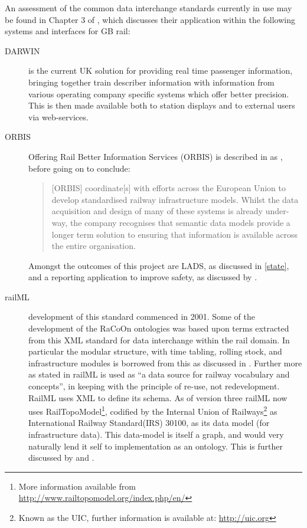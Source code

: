 An assessment of the common data interchange standards currently in use may be found in Chapter 3 of \citet{Tutcher2015}, which discusses their application within the following systems and interfaces for GB rail:
\begin{description}
    \item[DARWIN] is the current UK solution for providing real time passenger information, bringing together train describer information with information from various operating company specific systems which offer better precision. This is then made available both to station displays and to external users via web-services.
    \item[ORBIS] Offering Rail Better Information Services (ORBIS) is described in \citet{Tutcher2015}  as , before going on to conclude: 
    \begin{quote}
       [ORBIS] coordinate[s] with efforts across the European Union to develop standardised railway infrastructure models. Whilst the data acquisition and design of many of these systems is already under-way, the company recognises that semantic data models provide a longer term solution to ensuring that information is available across the entire organisation.
    \end{quote}
    Amongst the outcomes of this project are LADS, as discussed in \autoref{state}, and a  reporting application to improve safety, as discussed by \citet{Rail}.
    \item[railML] development of this standard commenced in 2001. Some of the development of the RaCoOn ontologies was based upon terms extracted from this XML standard for data interchange within the rail domain. In particular the modular structure, with time tabling, rolling stock, and infrastructure modules is borrowed from this as discussed in \citet{Tutcher2015}. Further more as stated in \citet{Tutcher2015} railML is used as ``a data source for railway vocabulary and concepts'', in keeping with the principle of re-use, not redevelopment. RailML uses XML to define its schema. As of version three railML now uses RailTopoModel\footnote{More information available from \url{http://www.railtopomodel.org/index.php/en/}}, codified by the Internal Union of Railways\footnote{Known as the UIC, further information is available at: \url{http://uic.org} } as International Railway Standard(IRS) 30100, as its data model (for infrastructure data). This data-model is itself a graph, and would very naturally lend it self to implementation as an ontology. This is further discussed by \citet{Nash2010} and \cite{RailML.org}.

\end{description}
